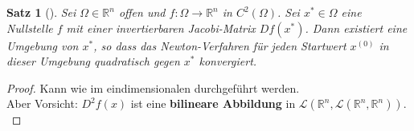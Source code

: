 \documentclass[ngerman,fontsize=11pt, paper=a4, parskip=half, titlepage=true, toc=bib]{scrbook}
\theoremstyle{definition}
\theoremstyle{plain}
\newtheorem{Satz}[Def]{Satz}		%
\newcommand{\R}{\mathds{R}}
\newcommand{\Ren}{\mathds{R}^{n}}
\newcommand{\subsectione}[1]{\subsection{#1} \addtocounter{Def}{1}}
\newenvironment{Satze}[1][]{ %
	\begin{Satz}[#1]
}
{
	\end{Satz}
	\addtocounter{subsection}{1}
}
\begin{document}
  \begin{Satze}
  	Sei $\Omega\in\R^n$ offen und $f:\Omega\rightarrow\Ren$ in $C^2(\Omega)$.
  	Sei $x^{*}\in\Omega $ eine Nullstelle $f$ mit einer invertierbaren Jacobi-Matrix $Df(x^{*})$.
  	Dann existiert eine Umgebung von $x^{*}$, so dass das Newton-Verfahren 
  	für jeden Startwert $x^{(0)}$ in dieser Umgebung
  	quadratisch gegen $x^{*}$ konvergiert.
  \end{Satze}
  
  \begin{proof}
    Kann wie im eindimensionalen durchgeführt werden.\\
    Aber Vorsicht: $D^2f(x)$ ist eine \textbf{bilineare Abbildung} in 
    $\mathcal{L}(\Ren, \mathcal{L}(\Ren, \Ren))$. \\
    

\end{proof}
\end{document}
